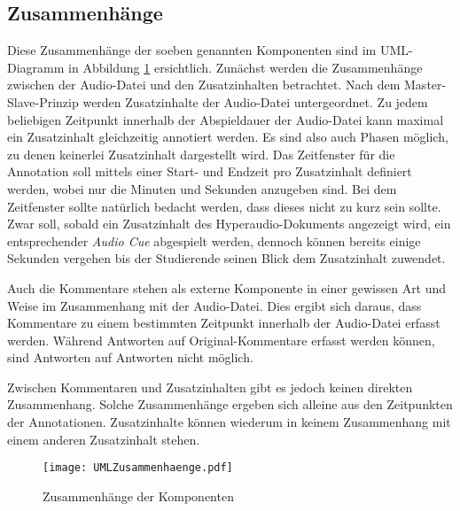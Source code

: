 \subsection{Zusammenhänge}
\label{sec:komponenten_zusammenhaenge}
Diese Zusammenhänge der soeben genannten Komponenten sind im UML-Diagramm in Abbildung \ref{fig:UMLAufbau} ersichtlich. Zunächst werden die Zusammenhänge zwischen der Audio-Datei und den Zusatzinhalten betrachtet. Nach dem Master-Slave-Prinzip werden Zusatzinhalte der Audio-Datei untergeordnet. Zu jedem beliebigen Zeitpunkt innerhalb der Abspieldauer der Audio-Datei kann maximal ein Zusatzinhalt gleichzeitig annotiert werden. Es sind also auch Phasen möglich, zu denen keinerlei Zusatzinhalt dargestellt wird. Das Zeitfenster für die Annotation soll mittels einer Start- und Endzeit pro Zusatzinhalt definiert werden, wobei nur die Minuten und Sekunden anzugeben sind. Bei dem Zeitfenster sollte natürlich bedacht werden, dass dieses nicht zu kurz sein sollte. Zwar soll, sobald ein Zusatzinhalt des Hyperaudio-Dokuments angezeigt wird, ein entsprechender \textit{Audio Cue} abgespielt werden, dennoch können bereits einige Sekunden vergehen bis der Studierende seinen Blick dem Zusatzinhalt zuwendet.

Auch die Kommentare stehen als externe Komponente in einer gewissen Art und Weise im Zusammenhang mit der Audio-Datei. Dies ergibt sich daraus, dass Kommentare zu einem bestimmten Zeitpunkt innerhalb der Audio-Datei erfasst werden. Während Antworten auf Original-Kommentare erfasst werden können, sind Antworten auf Antworten nicht möglich.

Zwischen Kommentaren und Zusatzinhalten gibt es jedoch keinen direkten Zusammenhang. Solche Zusammenhänge ergeben sich alleine aus den Zeitpunkten der Annotationen. Zusatzinhalte können wiederum in keinem Zusammenhang mit einem anderen Zusatzinhalt stehen.


\begin{figure}[h!]
\texttt{[image: UMLZusammenhaenge.pdf]}
\caption{\label{fig:UMLAufbau}Zusammenhänge der Komponenten}
\end{figure}


